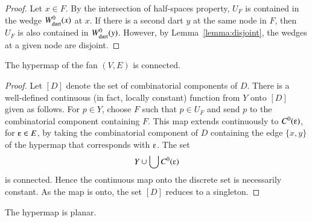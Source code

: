 \begin{proof}  Let $x\in F$.  By the intersection of half-spaces property, $U_F$ is contained in the wedge $W^0_{\text{dart}}(x)$ at $x$.  If there is a second dart $y$ at the same node in $F$, then $U_F$ is also contained in $W^0_{\text{dart}}(y)$. However, by Lemma~\ref{lemma:disjoint}, the wedges at a given node are disjoint.
\end{proof}

\begin{corollary}  
The hypermap of the fan $(V,E)$ is connected.
\end{corollary}


\begin{proof}  Let $[D]$ denote the set of combinatorial components of $D$.
There is a well-defined continuous (in fact, locally constant) function from $Y$ onto $[D]$ given as follows.  For $p\in Y$, choose $F$ such that $p\in U_F$ and send $p$ to the combinatorial component containing $F$.  This map extends continuously to $C^0(\e)$, for $\e\in E$, by taking the combinatorial component of $D$ containing the edge $\{x,y\}$ of the hypermap that corresponds with $\e$.  The set
$$
Y\cup \bigcup C^0(\e)
$$
is connected.  Hence the continuous map onto the discrete set is necessarily constant.  As the map is onto, the set $[D]$ reduces to a singleton.
\end{proof}

\begin{corollary}  
The hypermap is planar.
\end{corollary}

